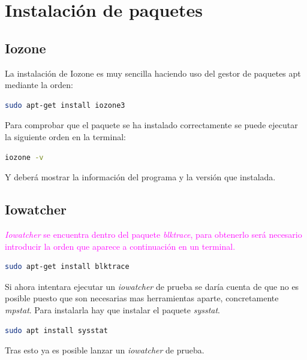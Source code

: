 \section{Instalación de paquetes}
\subsection{Iozone}
La instalación de Iozone es muy sencilla  haciendo uso del gestor de paquetes apt mediante la orden: 
\begin{lstlisting}[language=bash]
sudo apt-get install iozone3
\end{lstlisting}
Para comprobar que el paquete se ha instalado correctamente  se puede ejecutar la siguiente orden en la terminal:
\begin{lstlisting}[language=bash]
iozone -v
\end{lstlisting}
Y deberá mostrar la información del programa y la versión que instalada.

\subsection{Iowatcher}
\textcolor{magenta}{\textit{Iowatcher} se encuentra dentro del paquete \textit{blktrace}, para obtenerlo será necesario introducir la orden que aparece a continuación en un terminal.}
\begin{lstlisting}[language=bash]
sudo apt-get install blktrace
\end{lstlisting}
Si ahora intentara ejecutar un \textit{iowatcher} de prueba se daría cuenta de que no es posible puesto que son necesarias mas herramientas aparte, concretamente \textit{mpstat}. Para instalarla hay que instalar el paquete \textit{sysstat}.
\begin{lstlisting}[language=bash]
sudo apt install sysstat
\end{lstlisting}
Tras esto ya es posible lanzar un \textit{iowatcher} de prueba.

